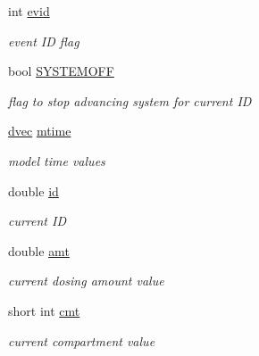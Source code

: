 \begin{DoxyCompactItemize}
int \hyperlink{structdatabox_a3eef427a04c0d6fe56cf6b566eed1461}{evid}
\begin{DoxyCompactList}\small\item\em event ID flag \end{DoxyCompactList}\item 
\mbox{\label{structdatabox_ae4c8b09dab65824965df8fcbfd38ae6c}} 
bool \hyperlink{structdatabox_ae4c8b09dab65824965df8fcbfd38ae6c}{S\+Y\+S\+T\+E\+M\+O\+FF}
\begin{DoxyCompactList}\small\item\em flag to stop advancing system for current ID \end{DoxyCompactList}\item 
\mbox{\label{structdatabox_afcc24e6bcd9b78c787971887c8202a4f}} 
\hyperlink{mrgsolv_8h_ac6aa1a2351760492203846ae74778c05}{dvec} \hyperlink{structdatabox_afcc24e6bcd9b78c787971887c8202a4f}{mtime}
\begin{DoxyCompactList}\small\item\em model time values \end{DoxyCompactList}\item 
\mbox{\label{structdatabox_ac8ff29b5749f2ab53d50622efdc7248c}} 
double \hyperlink{structdatabox_ac8ff29b5749f2ab53d50622efdc7248c}{id}
\begin{DoxyCompactList}\small\item\em current ID \end{DoxyCompactList}\item 
\mbox{\label{structdatabox_a6200c84a1770e5ab934aa22e1f692e2e}} 
double \hyperlink{structdatabox_a6200c84a1770e5ab934aa22e1f692e2e}{amt}
\begin{DoxyCompactList}\small\item\em current dosing amount value \end{DoxyCompactList}\item 
\mbox{\label{structdatabox_af34a6d032da16394ca179e55a3187f9d}} 
short int \hyperlink{structdatabox_af34a6d032da16394ca179e55a3187f9d}{cmt}
\begin{DoxyCompactList}\small\item\em current compartment value \end{DoxyCompactList}\item 

\end{DoxyCompactItemize}
